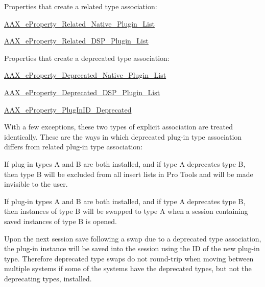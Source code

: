Properties that create a related type association\+: 
\begin{DoxyItemize}
\item \mbox{\hyperlink{a00662_a13e384f22825afd3db6d68395b79ce0dae47f50370ae2f6bf29b8cacc6a41d924}{A\+A\+X\+\_\+e\+Property\+\_\+\+Related\+\_\+\+Native\+\_\+\+Plugin\+\_\+\+List}} 
\item \mbox{\hyperlink{a00662_a13e384f22825afd3db6d68395b79ce0da9dc35184d705e963f14f85df4d71193d}{A\+A\+X\+\_\+e\+Property\+\_\+\+Related\+\_\+\+D\+S\+P\+\_\+\+Plugin\+\_\+\+List}} 
\end{DoxyItemize}

Properties that create a deprecated type association\+: 
\begin{DoxyItemize}
\item \mbox{\hyperlink{a00662_a13e384f22825afd3db6d68395b79ce0da3f1e690c987d601001a7cc1da8247399}{A\+A\+X\+\_\+e\+Property\+\_\+\+Deprecated\+\_\+\+Native\+\_\+\+Plugin\+\_\+\+List}} 
\item \mbox{\hyperlink{a00662_a13e384f22825afd3db6d68395b79ce0dab102bc794f2770c14b1f0fe2dde6766a}{A\+A\+X\+\_\+e\+Property\+\_\+\+Deprecated\+\_\+\+D\+S\+P\+\_\+\+Plugin\+\_\+\+List}} 
\item \mbox{\hyperlink{a00662_a13e384f22825afd3db6d68395b79ce0dadb254df9b6114516beed7a04675a22a3}{A\+A\+X\+\_\+e\+Property\+\_\+\+Plug\+In\+I\+D\+\_\+\+Deprecated}} 
\end{DoxyItemize}

With a few exceptions, these two types of explicit association are treated identically. These are the ways in which deprecated plug-\/in type association differs from related plug-\/in type association\+: 
\begin{DoxyItemize}
\item If plug-\/in types A and B are both installed, and if type A deprecates type B, then type B will be excluded from all insert lists in Pro Tools and will be made invisible to the user. 
\item If plug-\/in types A and B are both installed, and if type A deprecates type B, then instances of type B will be swapped to type A when a session containing saved instances of type B is opened. 
\item Upon the next session save following a swap due to a deprecated type association, the plug-\/in instance will be saved into the session using the ID of the new plug-\/in type. Therefore deprecated type swaps do not round-\/trip when moving between multiple systems if some of the systems have the deprecated types, but not the deprecating types, installed. 
\end{DoxyItemize}


